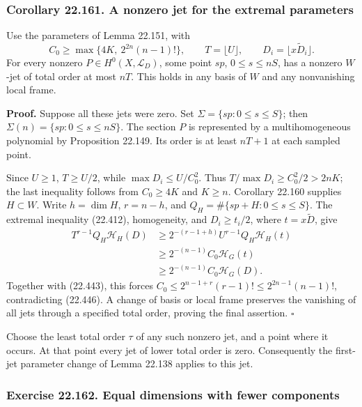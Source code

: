 \documentclass[
  11pt,
  a4paper,
]{article}
\begin{document}
\subsubsection{Corollary 22.161. A nonzero jet for the extremal
parameters}\label{corollary-22.161.-a-nonzero-jet-for-the-extremal-parameters}

Use the parameters of Lemma 22.151, with \[
 C_0\ge\max\{4K,\ 2^{2n}(n-1)!\},
 \qquad T=\lfloor U\rfloor,\qquad D_i=\lfloor x\widetilde D_i\rfloor.
 \tag{22.446}
\] For every nonzero \(P\in H^0(X,\mathcal L_D)\), some point \(sp\),
\(0\le s\le nS\), has a nonzero \(W\)-jet of total order at most \(nT\).
This holds in any basis of \(W\) and any nonvanishing local frame.

\textbf{Proof.} Suppose all these jets were zero. Set
\(\Sigma=\{sp:0\le s\le S\}\); then \(\Sigma(n)=\{sp:0\le s\le nS\}\).
The section \(P\) is represented by a multihomogeneous polynomial by
Proposition 22.149. Its order is at least \(nT+1\) at each sampled
point.

Since \(U\ge1\), \(T\ge U/2\), while \(\max D_i\le U/C_0^2\). Thus
\(T/\max D_i\ge C_0^2/2>2nK\); the last inequality follows from
\(C_0\ge4K\) and \(K\ge n\). Corollary 22.160 supplies \(H\subset W\).
Write \(h=\dim H\), \(r=n-h\), and \(Q_H=\#\{sp+H:0\le s\le S\}\). The
extremal inequality (22.412), homogeneity, and \(D_i\ge t_i/2\), where
\(t=x\widetilde D\), give \[
 \begin{aligned}
 T^{r-1}Q_H\mathcal H_H(D)
 &\ge 2^{-(r-1+h)}U^{r-1}Q_H\mathcal H_H(t)\\
 &\ge 2^{-(n-1)}C_0\mathcal H_G(t)\\
 &\ge 2^{-(n-1)}C_0\mathcal H_G(D).
 \end{aligned}
 \tag{22.447}
\] Together with (22.443), this forces
\(C_0\le2^{n-1+r}(r-1)!\le2^{2n-1}(n-1)!\), contradicting (22.446). A
change of basis or local frame preserves the vanishing of all jets
through a specified total order, proving the final assertion.
\(\square\)

Choose the least total order \(\tau\) of any such nonzero jet, and a
point where it occurs. At that point every jet of lower total order is
zero. Consequently the first-jet parameter change of Lemma 22.138
applies to this jet.

\subsubsection{Exercise 22.162. Equal dimensions with fewer
components}\label{exercise-22.162.-equal-dimensions-with-fewer-components}
\end{document}
